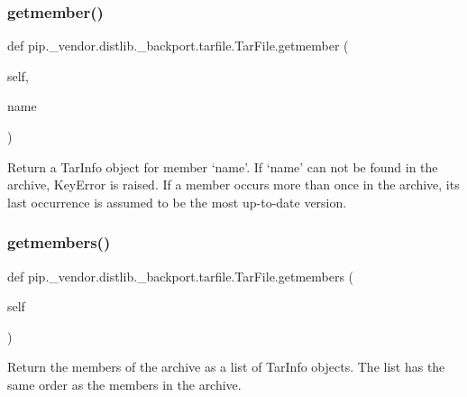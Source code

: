 \subsubsection{\texorpdfstring{getmember()}{getmember()}}
{\footnotesize\ttfamily def pip.\+\_\+vendor.\+distlib.\+\_\+backport.\+tarfile.\+Tar\+File.\+getmember (\begin{DoxyParamCaption}\item[{}]{self,  }\item[{}]{name }\end{DoxyParamCaption})}

\begin{DoxyVerb}Return a TarInfo object for member `name'. If `name' can not be
   found in the archive, KeyError is raised. If a member occurs more
   than once in the archive, its last occurrence is assumed to be the
   most up-to-date version.
\end{DoxyVerb}
 \mbox{\label{classpip_1_1__vendor_1_1distlib_1_1__backport_1_1tarfile_1_1TarFile_accd273f57ca72fcb0b71ca9a5ef4c857}} 
\subsubsection{\texorpdfstring{getmembers()}{getmembers()}}
{\footnotesize\ttfamily def pip.\+\_\+vendor.\+distlib.\+\_\+backport.\+tarfile.\+Tar\+File.\+getmembers (\begin{DoxyParamCaption}\item[{}]{self }\end{DoxyParamCaption})}

\begin{DoxyVerb}Return the members of the archive as a list of TarInfo objects. The
   list has the same order as the members in the archive.
\end{DoxyVerb}
 \mbox{\label{classpip_1_1__vendor_1_1distlib_1_1__backport_1_1tarfile_1_1TarFile_a67eb1d86f0e22315acdbc8e15cd83a40}} 
